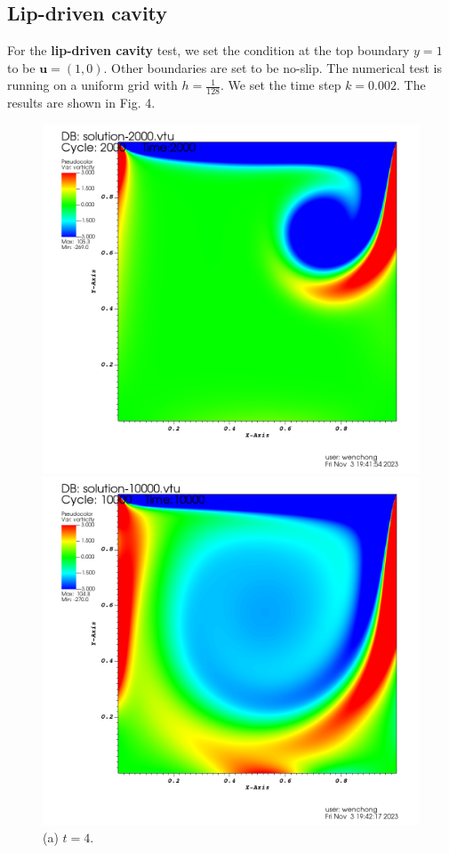 \documentclass[lang=en,11pt,a4paper,bibend=bibtex]{elegantpaper}
\begin{document}
\subsection{Lip-driven cavity}

For the \textbf{lip-driven cavity} test, we set the condition at
the top boundary $y=1$ to be $\mathbf{u}=(1,0)$. Other boundaries
are set to be no-slip. The numerical test is running on a uniform grid 
with $h=\frac{1}{128}$. We set the time step $k=0.002$. The results
are shown in Fig. 4.

\begin{figure}[H]
    \centering
    \begin{minipage}[t]{0.45\linewidth}
        \centering
        \includegraphics[width=0.9\linewidth]{png/lip-4.png}
        \caption*{(a) $t=4$.}
        \includegraphics[width=0.9\linewidth]{png/lip-20.png}

\end{minipage}
\end{figure}
\end{document}
